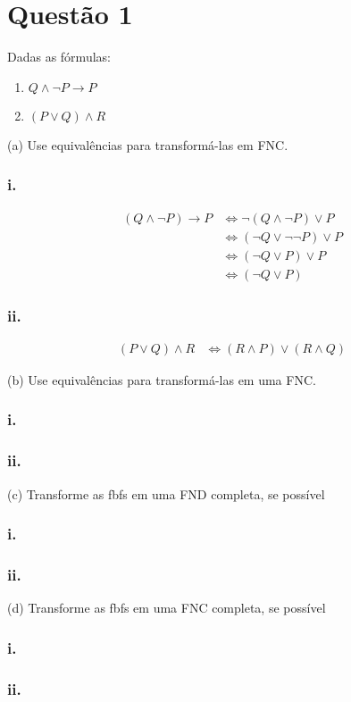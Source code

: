 \section*{Questão 1}

Dadas as fórmulas:

\begin{enumerate}[label=\roman*)]
    \item $Q \land \lnot P \rightarrow P$
    \item $(P \lor Q) \land R$
\end{enumerate}

\noindent
(a) Use equivalências para transformá-las em FNC.

\subsubsection*{i.}
\begin{align*}
    (Q \land \lnot P) \rightarrow P
    &\Leftrightarrow \lnot (Q \land \lnot P) \lor P \\[6pt]
    &\Leftrightarrow (\lnot Q \lor \lnot \lnot P) \lor P \\[6pt]
    &\Leftrightarrow (\lnot Q \lor P) \lor P \\[6pt]
    &\Leftrightarrow (\lnot Q \lor P)
\end{align*}

\subsubsection*{ii.}
\begin{align*}
    (P \lor Q) \land R
    &\Leftrightarrow (R \land P) \lor (R \land Q)
\end{align*}


\noindent
(b) Use equivalências para transformá-las em uma FNC.

\subsubsection*{i.}
\subsubsection*{ii.}

\noindent
(c) Transforme as fbfs em uma FND completa, se possível

\subsubsection*{i.}
\subsubsection*{ii.}

\noindent
(d) Transforme as fbfs em uma FNC completa, se possível

\subsubsection*{i.}
\subsubsection*{ii.}

